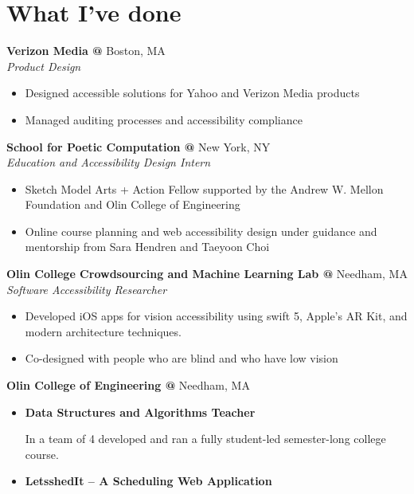 \documentclass[10pt]{article} %
\begin{document}
\begin{minipage}[t]{0.8\textwidth}
\section*{What I've done}
\textbf{Verizon Media @} \space Boston, MA \\
\textit{Product Design}\\
\begin{itemize} [noitemsep,topsep=0pt]
\item Designed accessible solutions for Yahoo and Verizon Media products
  \item Managed auditing processes and accessibility compliance
  \\
\end{itemize}
\textbf{School for Poetic Computation @} \space New York, NY \\
\textit{Education and Accessibility Design Intern}\\
\begin{itemize} [noitemsep,topsep=0pt]
\item Sketch Model Arts + Action Fellow supported by the Andrew W. Mellon Foundation and Olin College of Engineering
  \item Online course planning and web accessibility design under guidance and mentorship from Sara Hendren and Taeyoon Choi
  \\
\end{itemize}
\textbf{Olin College Crowdsourcing and Machine Learning Lab @} \space Needham, MA\\
\textit{Software Accessibility Researcher}\\
\begin{itemize} [noitemsep,topsep=0pt]
  \item Developed iOS apps for vision accessibility using swift 5, Apple’s AR Kit, and modern architecture techniques.
  \item Co-designed with people who are blind and who have low vision
  \\
\end{itemize}
\textbf{Olin College of Engineering @} \space Needham, MA\\
\begin{itemize} [noitemsep,topsep=0pt]
  \item {}\textbf{Data Structures and Algorithms Teacher}
  
  In a team of 4 developed and ran a fully student-led semester-long college course.
  \item {}\textbf{LetsshedIt – A Scheduling Web Application}


\end{itemize}
\end{minipage}
\end{document}

